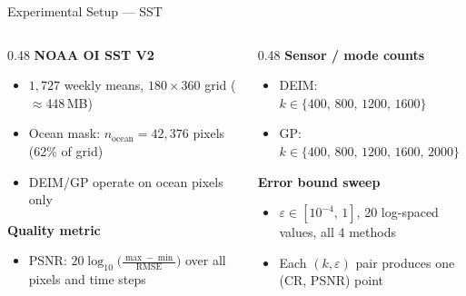 \documentclass[aspectratio=169, 11pt]{beamer}
\begin{document}
\begin{frame}{Experimental Setup --- SST}
\begin{columns}[T]

\begin{column}{0.48\textwidth}
  \textcolor{cteal}{\textbf{NOAA OI SST V2}}\vspace{0.2em}
  \begin{itemize}\setlength\itemsep{0.3em}\small
    \item $1{,}727$ weekly means, $180\times360$ grid ($\approx$448\,MB)
    \item Ocean mask: $n_\text{ocean} = 42{,}376$ pixels (62\% of grid)
    \item DEIM/GP operate on ocean pixels only
  \end{itemize}

  \vspace{0.6em}
  \textcolor{cteal}{\textbf{Quality metric}}\vspace{0.2em}
  \begin{itemize}\setlength\itemsep{0.3em}\small
    \item PSNR: $20\log_{10}\!\bigl(\tfrac{\max-\min}{\mathrm{RMSE}}\bigr)$ over all pixels and time steps
  \end{itemize}
\end{column}

\begin{column}{0.48\textwidth}
  \textcolor{cteal}{\textbf{Sensor / mode counts}}\vspace{0.2em}
  \begin{itemize}\setlength\itemsep{0.3em}\small
    \item DEIM: $k \in \{400,\,800,\,1200,\,1600\}$
    \item GP: $k \in \{400,\,800,\,1200,\,1600,\,2000\}$
  \end{itemize}

  \vspace{0.6em}
  \textcolor{cteal}{\textbf{Error bound sweep}}\vspace{0.2em}
  \begin{itemize}\setlength\itemsep{0.3em}\small
    \item $\varepsilon \in [10^{-4},\,1]$, 20 log-spaced values, all 4 methods
    \item Each $(k,\varepsilon)$ pair produces one (CR, PSNR) point
  \end{itemize}
\end{column}

\end{columns}
\end{frame}
\end{document}
